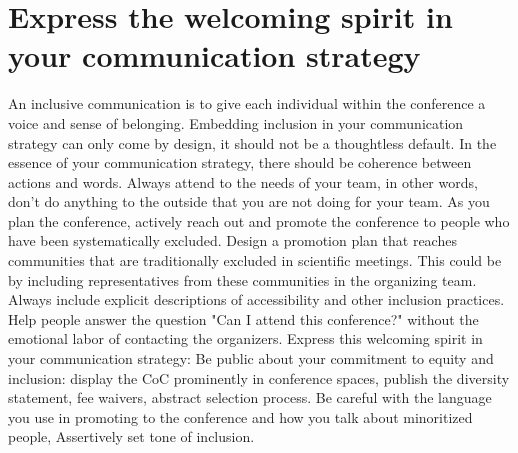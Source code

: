 \documentclass[10pt,letterpaper]{article}
\begin{document}


\section{Express the welcoming spirit in your communication strategy}
\label{rule_communication}
An inclusive communication is to give each individual within the conference a voice and sense of belonging. Embedding inclusion in your communication strategy can only come by design, it should not be a thoughtless default. In the essence of your communication strategy, there should be coherence between actions and words. Always attend to the needs of your team, in other words, don't do anything to the outside that you are not doing for your team. As you plan the conference, actively reach out and promote the conference to people who have been systematically excluded. Design a promotion plan that reaches communities that are traditionally excluded in scientific meetings. This could be by including representatives from these communities in the organizing team. Always include explicit descriptions of accessibility and other inclusion practices. Help people answer the question "Can I attend this conference?" without the emotional labor of contacting the organizers. Express this welcoming spirit in your communication strategy: Be public about your commitment to equity and inclusion: display the CoC prominently in conference spaces, publish the diversity statement, fee waivers, abstract selection process. Be careful with the language you use in promoting to the conference and how you talk about minoritized people, Assertively set tone of inclusion.
\end{document}
